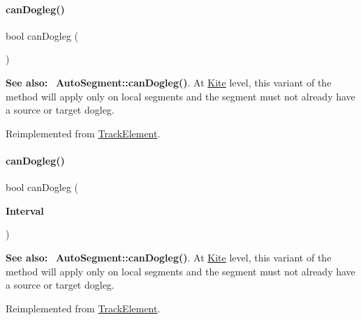 \paragraph{\texorpdfstring{can\+Dogleg()}{canDogleg()}\hspace{0.1cm}{\footnotesize\ttfamily [1/3]}}
{\footnotesize\ttfamily bool can\+Dogleg (\begin{DoxyParamCaption}{ }\end{DoxyParamCaption})\hspace{0.3cm}{\ttfamily [virtual]}}

{\bfseries See also\+:}~ \textbf{ Auto\+Segment\+::can\+Dogleg()}. At \hyperlink{namespaceKite}{Kite} level, this variant of the method will apply only on local segments and the segment must not already have a source or target dogleg. 

Reimplemented from \hyperlink{classKite_1_1TrackElement_aa0bb6f1592688e942ff67e0ac318a4fd}{Track\+Element}.

\mbox{\label{classKite_1_1TrackSegment_accb4c6a7ee2678a0cff4dbc4a7860fe1}} 
\paragraph{\texorpdfstring{can\+Dogleg()}{canDogleg()}\hspace{0.1cm}{\footnotesize\ttfamily [2/3]}}
{\footnotesize\ttfamily bool can\+Dogleg (\begin{DoxyParamCaption}\item[{\textbf{ Interval}}]{ }\end{DoxyParamCaption})\hspace{0.3cm}{\ttfamily [virtual]}}

{\bfseries See also\+:}~ \textbf{ Auto\+Segment\+::can\+Dogleg()}. At \hyperlink{namespaceKite}{Kite} level, this variant of the method will apply only on local segments and the segment must not already have a source or target dogleg. 

Reimplemented from \hyperlink{classKite_1_1TrackElement_accb4c6a7ee2678a0cff4dbc4a7860fe1}{Track\+Element}.

\mbox{\label{classKite_1_1TrackSegment_a4f040cf33009e4886d401115c3bea838}} 
